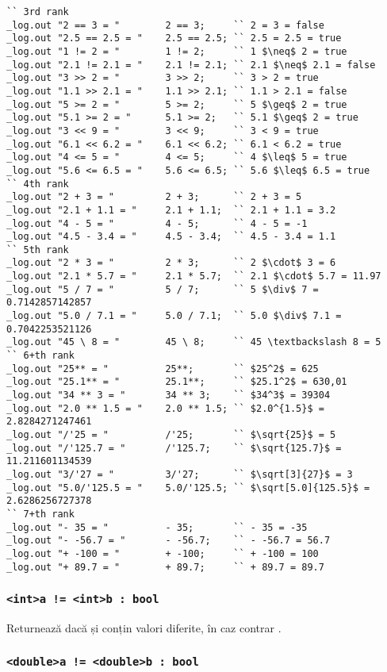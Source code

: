 \begin{lstlisting}[caption=Exemple de folosire al operatorilor asupra tipului int și double, label=numberopex]
`` 3rd rank
_log.out "2 == 3 = "		2 == 3;		`` 2 = 3 = false
_log.out "2.5 == 2.5 = "	2.5 == 2.5;	`` 2.5 = 2.5 = true
_log.out "1 != 2 = "		1 != 2;		`` 1 $\neq$ 2 = true
_log.out "2.1 != 2.1 = "	2.1 != 2.1;	`` 2.1 $\neq$ 2.1 = false
_log.out "3 >> 2 = "		3 >> 2;		`` 3 > 2 = true
_log.out "1.1 >> 2.1 = "	1.1 >> 2.1;	`` 1.1 > 2.1 = false
_log.out "5 >= 2 = "		5 >= 2;		`` 5 $\geq$ 2 = true
_log.out "5.1 >= 2 = "		5.1 >= 2;	`` 5.1 $\geq$ 2 = true
_log.out "3 << 9 = "		3 << 9;		`` 3 < 9 = true
_log.out "6.1 << 6.2 = "	6.1 << 6.2;	`` 6.1 < 6.2 = true
_log.out "4 <= 5 = "		4 <= 5;		`` 4 $\leq$ 5 = true
_log.out "5.6 <= 6.5 = "	5.6 <= 6.5;	`` 5.6 $\leq$ 6.5 = true
`` 4th rank
_log.out "2 + 3 = "			2 + 3;		`` 2 + 3 = 5
_log.out "2.1 + 1.1 = "		2.1 + 1.1;	`` 2.1 + 1.1 = 3.2
_log.out "4 - 5 = "			4 - 5;		`` 4 - 5 = -1
_log.out "4.5 - 3.4 = "		4.5 - 3.4;	`` 4.5 - 3.4 = 1.1
`` 5th rank
_log.out "2 * 3 = "			2 * 3;		`` 2 $\cdot$ 3 = 6
_log.out "2.1 * 5.7 = "		2.1 * 5.7;	`` 2.1 $\cdot$ 5.7 = 11.97
_log.out "5 / 7 = "			5 / 7;		`` 5 $\div$ 7 = 0.7142857142857
_log.out "5.0 / 7.1 = "		5.0 / 7.1;	`` 5.0 $\div$ 7.1 = 0.7042253521126
_log.out "45 \ 8 = "		45 \ 8;		`` 45 \textbackslash 8 = 5
`` 6+th rank
_log.out "25** = "			25**;		`` $25^2$ = 625
_log.out "25.1** = "		25.1**;		`` $25.1^2$ = 630,01
_log.out "34 ** 3 = "		34 ** 3;	`` $34^3$ = 39304
_log.out "2.0 ** 1.5 = "	2.0 ** 1.5;	`` $2.0^{1.5}$ = 2.8284271247461
_log.out "/'25 = "			/'25;		`` $\sqrt{25}$ = 5
_log.out "/'125.7 = "		/'125.7;	`` $\sqrt{125.7}$ = 11.211601134539
_log.out "3/'27 = "			3/'27;		`` $\sqrt[3]{27}$ = 3
_log.out "5.0/'125.5 = "	5.0/'125.5;	`` $\sqrt[5.0]{125.5}$ = 2.6286256727378
`` 7+th rank
_log.out "- 35 = "			- 35;		`` - 35 = -35
_log.out "- -56.7 = "		- -56.7;	`` - -56.7 = 56.7
_log.out "+ -100 = "		+ -100;		`` + -100 = 100
_log.out "+ 89.7 = "		+ 89.7;		`` + 89.7 = 89.7
\end{lstlisting}

\subsubsection{\lstinline|<int>a != <int>b : bool|}

Returnează \true{} dacă  și  conțin valori diferite, în caz contrar \false{}.

\subsubsection{\lstinline|<double>a != <double>b : bool|}

